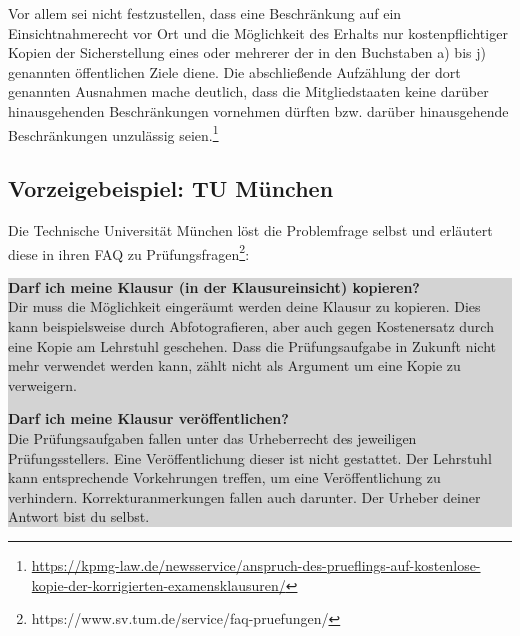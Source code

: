 \documentclass[12pt, a4paper]{article}
\begin{document}
Vor allem sei nicht festzustellen, dass eine Beschränkung auf ein Einsichtnahmerecht vor Ort und die Möglichkeit des Erhalts nur kostenpflichtiger Kopien der Sicherstellung eines oder mehrerer der in den Buchstaben a) bis j) genannten öffentlichen Ziele diene. Die abschließende Aufzählung der dort genannten Ausnahmen mache deutlich, dass die Mitgliedstaaten keine darüber hinausgehenden Beschränkungen vornehmen dürften bzw. darüber hinausgehende Beschränkungen unzulässig seien.\footnote{\href{https://kpmg-law.de/newsservice/anspruch-des-prueflings-auf-kostenlose-kopie-der-korrigierten-examensklausuren/}{https://kpmg-law.de/newsservice/anspruch-des-prueflings-auf-kostenlose-kopie-der-korrigierten-examensklausuren/}} 


\subsection{Vorzeigebeispiel: TU München}
Die Technische Universität München löst die Problemfrage selbst und erläutert diese in ihren FAQ zu Prüfungsfragen\footnote{https://www.sv.tum.de/service/faq-pruefungen/}:

\subitem\colorbox{lightgray}{
    \begin{minipage}[h]{0.9\linewidth}
        \textbf{Darf ich meine Klausur (in der Klausureinsicht) kopieren?}\\
        Dir muss die Möglichkeit eingeräumt werden deine Klausur zu kopieren. Dies kann beispielsweise durch Abfotografieren, aber auch gegen Kostenersatz durch eine Kopie am Lehrstuhl geschehen. Dass die Prüfungsaufgabe in Zukunft nicht mehr verwendet werden kann, zählt nicht als Argument um eine Kopie zu verweigern.\vspace{.5cm}

        \textbf{Darf ich meine Klausur veröffentlichen?}\\
        Die Prüfungsaufgaben fallen unter das Urheberrecht des jeweiligen Prüfungsstellers. Eine Veröffentlichung dieser ist nicht gestattet. Der Lehrstuhl kann entsprechende Vorkehrungen treffen, um eine Veröffentlichung zu verhindern. Korrekturanmerkungen fallen auch darunter. Der Urheber deiner Antwort bist du selbst.
    \end{minipage}
}
\end{document}
